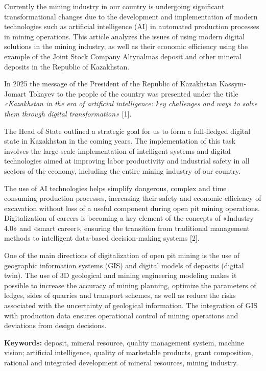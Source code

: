 Currently the mining industry in our country is undergoing significant
transformational changes due to the development and implementation of
modern technologies such as artificial intelligence (AI) in automated
production processes in mining operations. This article analyzes the
issues of using modern digital solutions in the mining industry, as well
as their economic efficiency using the example of the Joint Stock
Company Altynalmas deposit and other mineral deposits in the Republic of
Kazakhstan.

In 2025 the message of the President of the Republic of Kazakhstan
Kassym-Jomart Tokayev to the people of the country was presented under
the title \emph{«Kazakhstan in the era of artificial intelligence: key
challenges and ways to solve them through digital transformation»}
{[}1{]}.

The Head of State outlined a strategic goal for us to form a
full-fledged digital state in Kazakhstan in the coming years. The
implementation of this task involves the large-scale implementation of
intelligent systems and digital technologies aimed at improving labor
productivity and industrial safety in all sectors of the economy,
including the entire mining industry of our country.

The use of AI technologies helps simplify dangerous, complex and time
consuming production process\-es, increasing their safety and economic
efficiency of excavation without loss of a useful component during open
pit mining operations. Digitalization of careers is becoming a key
element of the concepts of «Industry 4.0» and «smart career», ensuring
the transition from traditional management methods to intelligent
data-based decision-making systems {[}2{]}.

One of the main directions of digitalization of open pit mining is the
use of geographic information systems (GIS) and digital models of
deposits (digital twin). The use of 3D geological and mining engineer\-ing
modeling makes it possible to increase the accuracy of mining planning,
optimize the parameters of ledges, sides of quarries and transport
schemes, as well as reduce the risks associated with the uncertainty of
geological information. The integration of GIS with production data
ensures operational control of mining operations and deviations from
design decisions.

{\bfseries Keywords:} deposit, mineral resource, quality management system,
machine vision; artificial intelli\-gence, quality of marketable products,
grant composition, rational and integrated development of mineral
resources, mining industry.

